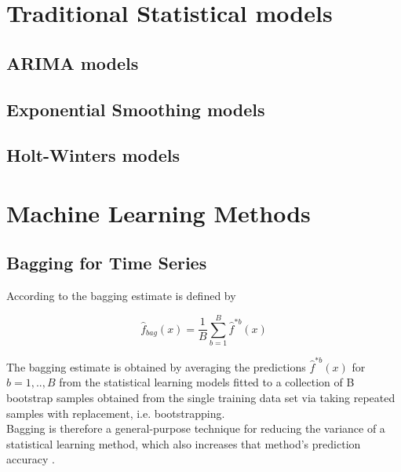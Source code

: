 \section{Traditional Statistical models}

\subsection{ARIMA models}

\subsection{Exponential Smoothing models}

\subsection{Holt-Winters models}

\section{Machine Learning Methods}

\subsection{Bagging for Time Series}

According to \textcite{hastie2009} the bagging estimate is defined by

\begin{equation} 
\hat{f}_{bag}(x)=\frac{1}{B} \sum_{b=1}^B\hat{f}^{*b}(x)
\end{equation}

\noindent The bagging estimate is obtained by averaging the predictions $\hat{f}^{*b}(x)$ for\\ $ b=1,..,B $ from the statistical learning models fitted to a collection of B bootstrap samples obtained from the single training data set via taking repeated samples with replacement, i.e. bootstrapping.\\
Bagging is therefore a general-purpose technique for reducing the variance of a statistical learning method, which also increases that method's prediction accuracy \citep{james2013}.\\

